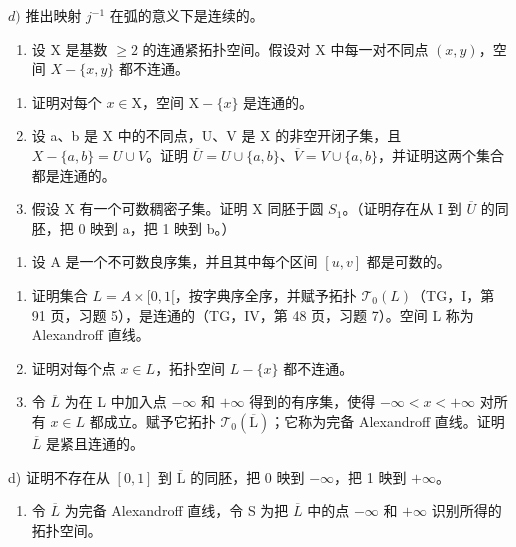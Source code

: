 \(d)\) 推出映射 \(j^{-1}\) 在弧的意义下是连续的。

\begin{enumerate}
\def\labelenumi{\arabic{enumi})}
\setcounter{enumi}{7}
\tightlist
\item
  设 X 是基数 \(\geqslant 2\) 的连通紧拓扑空间。假设对 X 中每一对不同点 \((x,y)\)，空间 \(X - \{x,y\}\) 都不连通。
\end{enumerate}

\begin{enumerate}
\def\labelenumi{\alph{enumi})}
\item
  证明对每个 \(x \in \mathrm{X}\)，空间 \(\mathrm{X} - \{x\}\) 是连通的。
\item
  设 a、b 是 X 中的不同点，U、V 是 X 的非空开闭子集，且 \(X - \{a,b\}=U\cup V\)。证明 \(\overline{U} = U \cup \{a, b\}\)、\(\overline{V} = V \cup \{a, b\}\)，并证明这两个集合都是连通的。
\item
  假设 X 有一个可数稠密子集。证明 X 同胚于圆 \(S_{1}\)。（证明存在从 I 到 \(\overline{U}\) 的同胚，把 0 映到 a，把 1 映到 b。）
\end{enumerate}

\begin{enumerate}
\def\labelenumi{\arabic{enumi})}
\setcounter{enumi}{8}
\tightlist
\item
  设 A 是一个不可数良序集，并且其中每个区间 \([u, v]\) 都是可数的。
\end{enumerate}

\begin{enumerate}
\def\labelenumi{\alph{enumi})}
\item
  证明集合 \(L = A \times [0, 1[\)，按字典序全序，并赋予拓扑 \(\mathcal{T}_{0}(L)\)（TG，I，第 91 页，习题 5），是连通的（TG，IV，第 48 页，习题 7）。空间 L 称为 Alexandroff 直线。
\item
  证明对每个点 \(x \in L\)，拓扑空间 \(L - \{x\}\) 都不连通。
\item
  令 \(\overline{L}\) 为在 L 中加入点 \(-\infty\) 和 \(+\infty\) 得到的有序集，使得 \(-\infty < x < +\infty\) 对所有 \(x \in L\) 都成立。赋予它拓扑 \(\mathcal{T}_{0}(\overline{\mathrm{L}})\)；它称为完备 Alexandroff 直线。证明 \(\overline{L}\) 是紧且连通的。
\end{enumerate}

d) 证明不存在从 \([0,1]\) 到 \(\overline{\mathrm{L}}\) 的同胚，把 0 映到 \(-\infty\)，把 1 映到 \(+\infty\)。

\begin{enumerate}
\def\labelenumi{\arabic{enumi})}
\setcounter{enumi}{9}
\tightlist
\item
  令 \(\overline{L}\) 为完备 Alexandroff 直线，令 S 为把 \(\overline{L}\) 中的点 \(-\infty\) 和 \(+\infty\) 识别所得的拓扑空间。
\end{enumerate}

